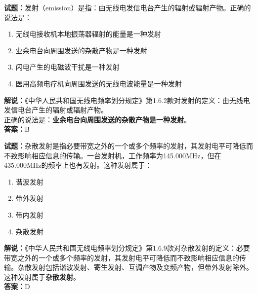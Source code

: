 \documentclass{ctexbook}
\begin{document}
\vspace{\baselineskip}

\noindent\textbf{试题：}发射（emission）是指：由无线电发信电台产生的辐射或辐射产物。正确的说法是：
\begin{enumerate}[leftmargin=3em]
  \item 无线电接收机本地振荡器辐射的能量是一种发射
  \item 业余电台向周围发送的杂散产物是一种发射
  \item 闪电产生的电磁波干扰是一种发射
  \item 医用高频电疗机向周围发送的无线电波能量是一种发射
\end{enumerate}
\noindent\textbf{解说：}《中华人民共和国无线电频率划分规定》第1.6.2款对发射的定义：由无线电发信电台产生的辐射或辐射产物。\\正确的说法是：\textbf{业余电台向周围发送的杂散产物是一种发射}。\\\noindent\textbf{答案：}B

\vspace{\baselineskip}

\noindent\textbf{试题：}杂散发射是指必要带宽之外的一个或多个频率的发射，其发射电平可降低而不致影响相应信息的传输。一台发射机，工作频率为145.000\si{\MHz}，但在435.000\si{\MHz}的频率上也有发射。这种发射属于：
\begin{enumerate}[leftmargin=3em]
  \item 谐波发射
  \item 带外发射
  \item 带内发射
  \item 杂散发射
\end{enumerate}
\noindent\textbf{解说：}《中华人民共和国无线电频率划分规定》第1.6.9款对杂散发射的定义：必要带宽之外的一个或多个频率的发射，其发射电平可降低而不致影响相应信息的传
输。杂散发射包括谐波发射、寄生发射、互调产物及变频产物，但带外发射除外。\\这种发射属于\textbf{杂散发射}。\\\noindent\textbf{答案：}D

\vspace{\baselineskip}
\end{document}
